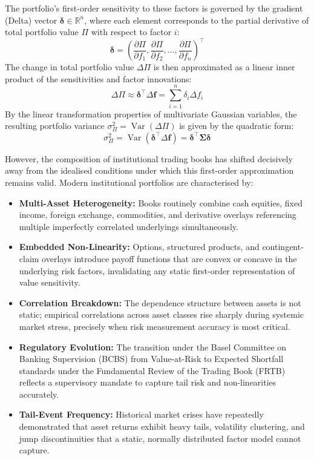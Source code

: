 \documentclass{article}
\theoremstyle{plain}
\theoremstyle{definition}
\theoremstyle{remark}
\DeclareMathOperator{\Var}{Var}
\begin{document}
The portfolio's first-order sensitivity to these factors is governed by the gradient (Delta) vector $\boldsymbol{\delta} \in \mathbb{R}^n$, where each element corresponds to the partial derivative of total portfolio value $\Pi$ with respect to factor $i$:
\begin{equation}
    \boldsymbol{\delta} = \left( \frac{\partial \Pi}{\partial f_1}, \frac{\partial \Pi}{\partial f_2}, \dots, \frac{\partial \Pi}{\partial f_n} \right)^\top
\end{equation}
The change in total portfolio value $\Delta \Pi$ is then approximated as a linear inner product of the sensitivities and factor innovations:
\begin{equation}
    \Delta \Pi \approx \boldsymbol{\delta}^\top \Delta \mathbf{f} = \sum_{i=1}^n \delta_i \Delta f_i
\end{equation}
By the linear transformation properties of multivariate Gaussian variables, the resulting portfolio variance $\sigma_{\Pi}^2 = \Var(\Delta \Pi)$ is given by the quadratic form:
\begin{equation}
    \sigma_{\Pi}^2 = \Var(\boldsymbol{\delta}^\top \Delta \mathbf{f}) = \boldsymbol{\delta}^\top \mathbf{\Sigma} \boldsymbol{\delta}
\end{equation}

However, the composition of institutional trading books has shifted decisively away from the idealised conditions under which this first-order approximation remains valid. Modern institutional portfolios are characterised by:
\begin{itemize}
    \item \textbf{Multi-Asset Heterogeneity:} Books routinely combine cash equities, fixed income, foreign exchange, commodities, and derivative overlays referencing multiple imperfectly correlated underlyings simultaneously.
    \item \textbf{Embedded Non-Linearity:} Options, structured products, and contingent-claim overlays introduce payoff functions that are convex or concave in the underlying risk factors, invalidating any static first-order representation of value sensitivity.
    \item \textbf{Correlation Breakdown:} The dependence structure between assets is not static; empirical correlations across asset classes rise sharply during systemic market stress, precisely when risk measurement accuracy is most critical.
    \item \textbf{Regulatory Evolution:} The transition under the Basel Committee on Banking Supervision (BCBS) from Value-at-Risk to Expected Shortfall standards under the Fundamental Review of the Trading Book (FRTB) reflects a supervisory mandate to capture tail risk and non-linearities accurately.
    \item \textbf{Tail-Event Frequency:} Historical market crises have repeatedly demonstrated that asset returns exhibit heavy tails, volatility clustering, and jump discontinuities that a static, normally distributed factor model cannot capture.
\end{itemize}
\end{document}
